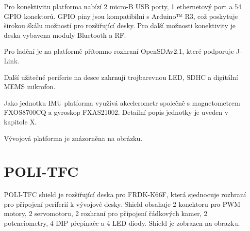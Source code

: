 Pro konektivitu platforma nabízí 2 micro-B USB porty, 1 ethernetový port a 54 GPIO konektorů.
GPIO piny jsou kompatibilní s Arduino™ R3, což poskytuje širokou škálu možností pro rozšiřující desky.
Pro další možnosti konektivity je deska vybavena moduly Bluetooth a RF.

Pro ladění je na platformě přítomno rozhraní OpenSDAv2.1, které podporuje J-Link.

Další užitečné periferie na desce zahrnují trojbarevnou LED, SDHC a digitální MEMS mikrofon.

Jako jednotku IMU platforma využívá akcelerometr společně s magnetometrem FXOS8700CQ
a gyroskop FXAS21002. Detailní popis jednotky je uveden v kapitole X.\cite{frdmk66UserGuide}

Vývojová platforma je znázorněna na obrázku.

\section{POLI-TFC}
\label{sec:POLI-TFC}
POLI-TFC shield je rozšiřující deska pro FRDK-K66F, která sjednocuje rozhraní pro
připojení periferií k vývojové desky. Shield obsahuje 2 konektoru pro PWM motory, 2 servomotoru,
2 rozhraní pro připojení řádkových kamer, 2 potenciometry, 4 DIP přepinače a 4 LED diody.
Shield je zobrazen na obrazku.
\endinput
